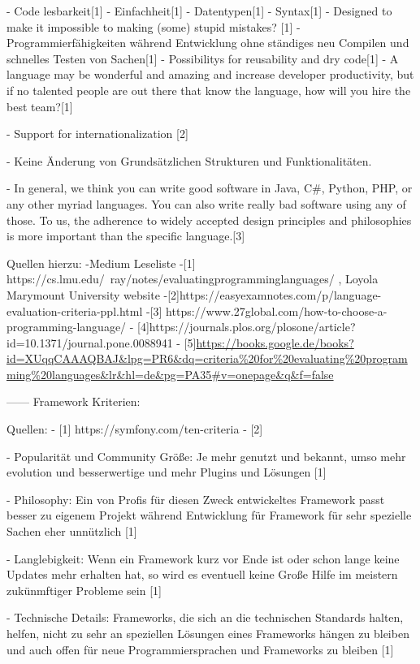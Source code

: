 - Code lesbarkeit[1]
- Einfachheit[1]
- Datentypen[1]
- Syntax[1]
- Designed to make it impossible to making (some) stupid mistakes? [1]
- Programmierfähigkeiten während Entwicklung ohne ständiges neu Compilen und schnelles Testen     von Sachen[1]
- Possibilitys for reusability and dry code[1]
- A language may be wonderful and amazing and increase developer productivity, but if no talented people are out there that know the language, how will you hire the best team?[1]

- Support for internationalization [2]

- Keine Änderung von Grundsätzlichen Strukturen und Funktionalitäten.

- In general, we think you can write good software in Java, C\#, Python, PHP, or any other myriad languages. You can also write really bad software using any of those. To us, the adherence to widely accepted design principles and philosophies is more important than the specific language.[3]



Quellen hierzu:
-Medium Leseliste
-[1] https://cs.lmu.edu/~ray/notes/evaluatingprogramminglanguages/  , Loyola Marymount University website
-[2]https://easyexamnotes.com/p/language-evaluation-criteria-ppl.html
-[3] https://www.27global.com/how-to-choose-a-programming-language/
- [4]https://journals.plos.org/plosone/article?id=10.1371/journal.pone.0088941
- [5]\url{https://books.google.de/books?id=XUqqCAAAQBAJ&lpg=PR6&dq=criteria%20for%20evaluating%20programming%20languages&lr&hl=de&pg=PA35#v=onepage&q&f=false}

------
Framework Kriterien:

Quellen:
- [1] https://symfony.com/ten-criteria
- [2]


- Popularität und Community Größe: Je mehr genutzt und bekannt, umso mehr evolution und besserwertige und mehr Plugins und Lösungen [1]

- Philosophy: Ein von Profis für diesen Zweck entwickeltes Framework passt besser zu eigenem Projekt während Entwicklung für Framework für sehr spezielle Sachen eher unnützlich [1]

- Langlebigkeit: Wenn ein Framework kurz vor Ende ist oder schon lange keine Updates mehr erhalten hat, so wird es eventuell keine Große Hilfe im meistern zukünmftiger Probleme sein [1]

- Technische Details: Frameworks, die sich an die technischen Standards halten, helfen, nicht zu sehr an speziellen Lösungen eines Frameworks hängen zu bleiben und auch offen für neue Programmiersprachen und Frameworks zu bleiben [1]

